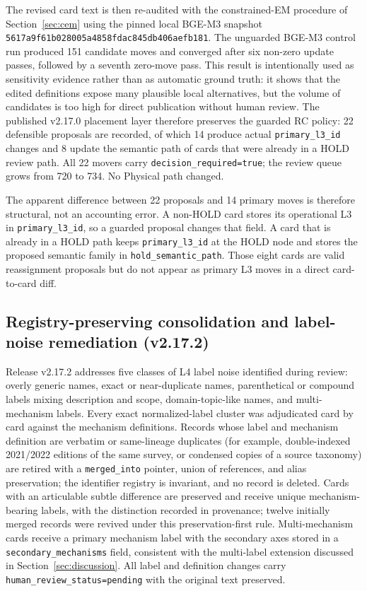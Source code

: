 \documentclass[11pt,a4paper]{article}
\newcommand{\code}[1]{\texttt{#1}}
\begin{document}
The revised card text is then re-audited with the constrained-EM procedure of Section~\ref{sec:cem} using the pinned local BGE-M3 snapshot
\code{5617a9f61b028005a4858fdac845db406aefb181}. The unguarded BGE-M3 control
run produced 151 candidate moves and converged after six non-zero update
passes, followed by a seventh zero-move pass. This result is intentionally
used as sensitivity evidence rather than as automatic ground truth: it shows
that the edited definitions expose many plausible local alternatives, but the
volume of candidates is too high for direct publication without human review.
The published v2.17.0 placement layer therefore preserves the guarded RC
policy: 22 defensible proposals are recorded, of which 14 produce actual
\code{primary\_l3\_id} changes and 8 update the semantic path of cards that
were already in a HOLD review path. All 22 movers carry
\code{decision\_required=true}; the review queue grows from 720 to 734. No
Physical path changed.

The apparent difference between 22 proposals and 14 primary moves is therefore
structural, not an accounting error. A non-HOLD card stores its operational L3
in \code{primary\_l3\_id}, so a guarded proposal changes that field. A card
that is already in a HOLD path keeps \code{primary\_l3\_id} at the HOLD node
and stores the proposed semantic family in \code{hold\_semantic\_path}. Those
eight cards are valid reassignment proposals but do not appear as primary L3
moves in a direct card-to-card diff.


\subsection{Registry-preserving consolidation and label-noise remediation (v2.17.2)}
\label{sec:consolidation}

Release v2.17.2 addresses five classes of L4 label noise identified during
review: overly generic names, exact or near-duplicate names, parenthetical or
compound labels mixing description and scope, domain-topic-like names, and
multi-mechanism labels. Every exact normalized-label cluster was adjudicated
card by card against the mechanism definitions. Records whose label and
mechanism definition are verbatim or same-lineage duplicates (for example,
double-indexed 2021/2022 editions of the same survey, or condensed copies of a
source taxonomy) are retired with a \code{merged\_into} pointer, union of
references, and alias preservation; the identifier registry is invariant, and
no record is deleted. Cards with an articulable subtle difference are
preserved and receive unique mechanism-bearing labels, with the distinction
recorded in provenance; twelve initially merged records were revived under
this preservation-first rule. Multi-mechanism cards receive a primary
mechanism label with the secondary axes stored in a
\code{secondary\_mechanisms} field, consistent with the multi-label extension
discussed in Section~\ref{sec:discussion}. All label and definition changes
carry \code{human\_review\_status=pending} with the original text preserved.
\end{document}
